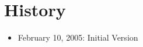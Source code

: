 \documentclass{article}
\begin{document}
\section{History}
\begin{itemize}
\item February 10, 2005: Initial Version
\end{itemize}
\end{document}
